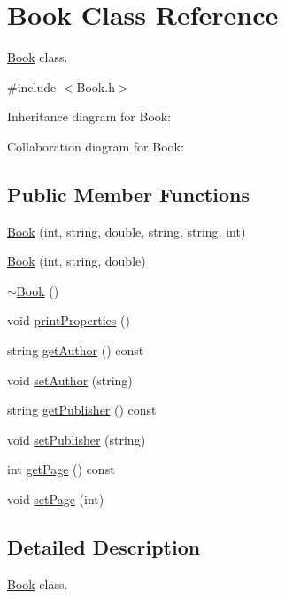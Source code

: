 \hypertarget{classBook}{}\section{Book Class Reference}
\label{classBook}


\hyperlink{classBook}{Book} class.  




{\ttfamily \#include $<$Book.\+h$>$}



Inheritance diagram for Book\+:


Collaboration diagram for Book\+:
\subsection*{Public Member Functions}
\begin{DoxyCompactItemize}
\item 
\hyperlink{classBook_af4bdcf29993e54f93e83af0f70648aac}{Book} (int, string, double, string, string, int)
\item 
\hyperlink{classBook_aea2d37325e0b9f93637e3a47d8e2855b}{Book} (int, string, double)
\item 
\hyperlink{classBook_a0ba8eceb34ea1301bc08942e37824767}{$\sim$\+Book} ()
\item 
void \hyperlink{classBook_ab430d9632f670b298b19c7b3e8d9acfc}{print\+Properties} ()
\item 
string \hyperlink{classBook_a3bd4acccf78a82061fc6c78107757620}{get\+Author} () const 
\item 
void \hyperlink{classBook_a837c5dbedad676a780b955c7ccfba859}{set\+Author} (string)
\item 
string \hyperlink{classBook_a5725f9e5bd44a126a832eb9411265d52}{get\+Publisher} () const 
\item 
void \hyperlink{classBook_ae1cc54edd9af29d7f05ef56a3a3039fc}{set\+Publisher} (string)
\item 
int \hyperlink{classBook_af70b3ead939a7271e427f17d4a92bfcd}{get\+Page} () const 
\item 
void \hyperlink{classBook_aa816ee3806073b0600aeb6d0f92cebfc}{set\+Page} (int)
\end{DoxyCompactItemize}


\subsection{Detailed Description}
\hyperlink{classBook}{Book} class. 

